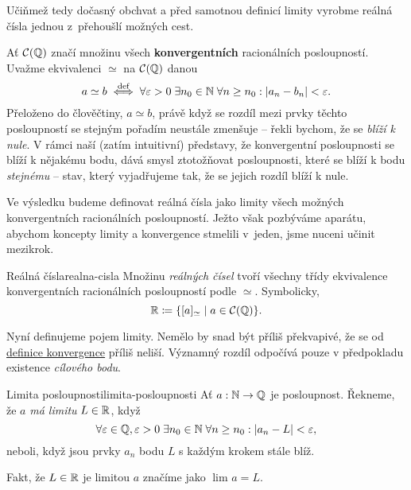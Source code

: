 Učiňmež tedy dočasný obchvat a před samotnou definicí limity vyrobme reálná
čísla jednou z~přehoušlí možných cest. 

Ať $\mathcal{C}(\mathbb{Q})$ značí množinu všech \textbf{konvergentních }racionálních
posloupností. Uvažme ekvivalenci $ \simeq $ na $\mathcal{C}(\mathbb{Q})$ danou
\[
 a \simeq b \overset{\text{def}}{\iff} \forall \varepsilon>0 \; \exists n_0 \in \mathbb{N}
 \; \forall n \geq n_0: |a_n - b_n| < \varepsilon.
\]
Přeloženo do člověčtiny, $a \simeq b$, právě když se rozdíl mezi prvky těchto
posloupností se stejným pořadím neustále zmenšuje -- řekli bychom, že se
\emph{blíží k nule}. V rámci naší (zatím intuitivní) představy, že konvergentní
posloupnosti se blíží k nějakému bodu, dává smysl ztotožňovat posloupnosti,
které se blíží k bodu \emph{stejnému} -- stav, který vyjadřujeme tak, že se
jejich rozdíl blíží k nule.

Ve výsledku budeme definovat reálná čísla jako limity všech možných
konvergentních racionálních posloupností. Ježto však pozbýváme aparátu, abychom
koncepty limity a konvergence stmelili v~jeden, jsme nuceni učinit mezikrok.

\begin{definition}{Reálná čísla}{realna-cisla}
 Množinu \emph{reálných čísel} tvoří všechny třídy ekvivalence konvergentních
 racionálních posloupností podle $ \simeq $. Symbolicky,
 \[
  \mathbb{R} \coloneqq \{[a]_{ \simeq } \mid a \in \mathcal{C}(\mathbb{Q})\}.
 \]
\end{definition}

Nyní definujeme pojem limity. Nemělo by snad být příliš překvapivé, že se od
\hyperref[def:konvergentni-posloupnost]{definice konvergence} příliš neliší.
Významný rozdíl odpočívá pouze v předpokladu existence \emph{cílového bodu}.

\begin{definition}{Limita posloupnosti}{limita-posloupnosti}
 Ať $a:\mathbb{N} \to \mathbb{Q}$ je posloupnost. Řekneme, že $a$ \emph{má limitu} $L \in \mathbb{R}$,
 když
 \[
  \forall \varepsilon \in \mathbb{Q},\varepsilon>0 \; \exists n_0 \in \mathbb{N} \; \forall n
  \geq n_0: |a_n - L|<\varepsilon,
 \]
 neboli, když jsou prvky $a_n$ bodu $L$ s každým krokem stále blíž.

 Fakt, že $L \in \mathbb{R}$ je limitou $a$ značíme jako $\lim_{} a = L$.
\end{definition}
